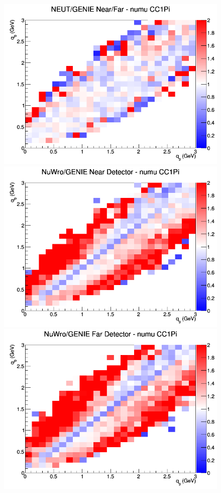 \begin{figure}[h]
\endminipage
{}
\includegraphics[width=\linewidth]{eff_q0_q3/LAr/ratios/CC1Pi_NEUT_GENIE_numu_NF_q3_q0.png}
\endminipage
\newline
{}
\includegraphics[width=\linewidth]{eff_q0_q3/LAr/ratios/CC1Pi_NuWro_GENIE_numu_near_q3_q0.png}
\endminipage
{}
\includegraphics[width=\linewidth]{eff_q0_q3/LAr/ratios/CC1Pi_NuWro_GENIE_numu_far_q3_q0.png}

\end{figure}
